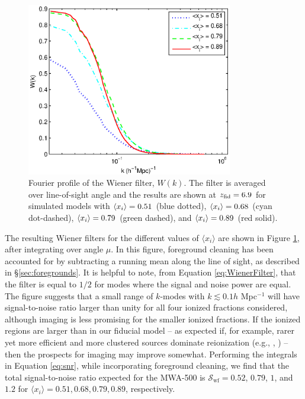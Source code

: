 \begin{figure}[h]
  \centering
  \includegraphics[width=9cm]{f1.eps}  
  \caption{Fourier profile of the Wiener filter, $W(k)$. The filter is averaged over
    line-of-sight angle and the results are shown at $z_{\rm fid} = 6.9$ for
simulated models with $\langle x_{i} \rangle = 0.51$ (blue dotted), $\langle x_{i} \rangle = 0.68$
    (cyan dot-dashed), $\langle x_{i} \rangle = 0.79$ (green dashed), and $\langle x_{i} \rangle = 0.89$ (red solid).}
  \label{fig:WienerFilter}
\end{figure}

The resulting Wiener filters for the different values of $\langle x_i \rangle$
are shown in Figure \ref{fig:WienerFilter}, after integrating over
angle $\mu$. In this figure, foreground cleaning has been accounted for by subtracting a running mean along the line of sight, as described in \S\ref{sec:foregrounds}. It is helpful to note, from Equation
\ref{eq:WienerFilter}, that the filter is equal to $1/2$ for modes
where the signal and noise power are equal. The figure suggests that a
small range of $k$-modes with $k \lesssim 0.1 h$ Mpc$^{-1}$ will have
signal-to-noise ratio larger than unity for all four ionized fractions
considered, although imaging is less promising for the smaller ionized
fractions. If the ionized regions are larger than in our fiducial
model --  as expected if, for example, rarer yet more efficient and
more clustered sources dominate reionization
(e.g., \citealt{McQuinn:2006et}, \citealt{Lidz:2007az}) -- then the
prospects for imaging may improve somewhat. Performing the integrals
in Equation \ref{eq:snr}, while incorporating foreground cleaning, we
find that the total signal-to-noise ratio expected for the MWA-500 is
$\mathcal{S}_{\text{wf}} = 0.52$, $0.79$, $1$, and $1.2$ for
$\langle x_i \rangle = 0.51, 0.68, 0.79, 0.89$, respectively. 


